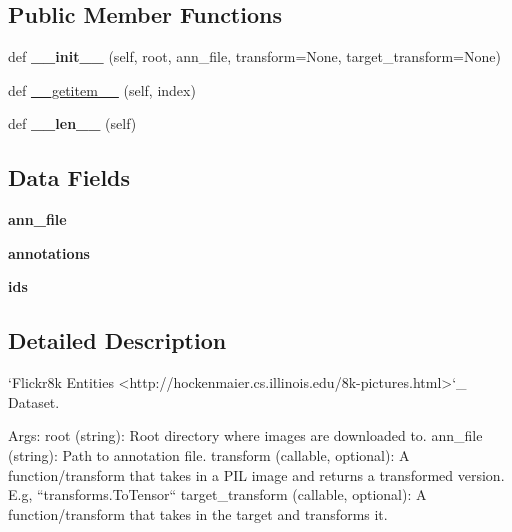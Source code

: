 \subsection*{Public Member Functions}
\begin{DoxyCompactItemize}
\item 
\mbox{\label{classtorchvision_1_1datasets_1_1flickr_1_1Flickr8k_a96db238682a5e1c65ad164e7433829be}} 
def {\bfseries \+\_\+\+\_\+init\+\_\+\+\_\+} (self, root, ann\+\_\+file, transform=None, target\+\_\+transform=None)
\item 
def \hyperlink{classtorchvision_1_1datasets_1_1flickr_1_1Flickr8k_ac31ef7d7be4520be6b318dfd65c91e0d}{\+\_\+\+\_\+getitem\+\_\+\+\_\+} (self, index)
\item 
\mbox{\label{classtorchvision_1_1datasets_1_1flickr_1_1Flickr8k_a8c0af943105a99d9efe31442e19283a0}} 
def {\bfseries \+\_\+\+\_\+len\+\_\+\+\_\+} (self)
\end{DoxyCompactItemize}
\subsection*{Data Fields}
\begin{DoxyCompactItemize}
\item 
\mbox{\label{classtorchvision_1_1datasets_1_1flickr_1_1Flickr8k_a823aa470b38adfdbc116d0d516024703}} 
{\bfseries ann\+\_\+file}
\item 
\mbox{\label{classtorchvision_1_1datasets_1_1flickr_1_1Flickr8k_a91148148b063e06f03148f13052856f4}} 
{\bfseries annotations}
\item 
\mbox{\label{classtorchvision_1_1datasets_1_1flickr_1_1Flickr8k_ab7a68d127753fb0fd98387b410ab76de}} 
{\bfseries ids}
\end{DoxyCompactItemize}


\subsection{Detailed Description}
\begin{DoxyVerb}`Flickr8k Entities <http://hockenmaier.cs.illinois.edu/8k-pictures.html>`_ Dataset.

Args:
    root (string): Root directory where images are downloaded to.
    ann_file (string): Path to annotation file.
    transform (callable, optional): A function/transform that takes in a PIL image
        and returns a transformed version. E.g, ``transforms.ToTensor``
    target_transform (callable, optional): A function/transform that takes in the
        target and transforms it.
\end{DoxyVerb}
 

